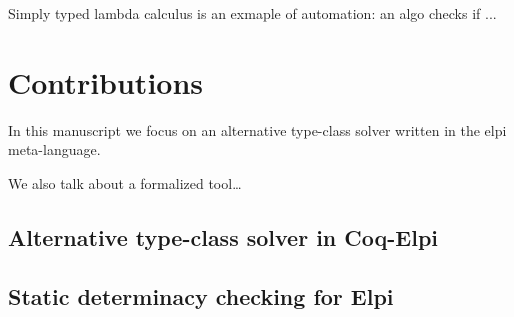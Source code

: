 Simply typed lambda calculus is an exmaple of automation: an algo checks
if ...


\section{Contributions}

In this manuscript we focus on an alternative type-class solver written
in the elpi meta-language.

We also talk about a formalized tool\dots

\subsection{Alternative type-class solver in Coq-Elpi}

\subsection{Static determinacy checking for Elpi}


